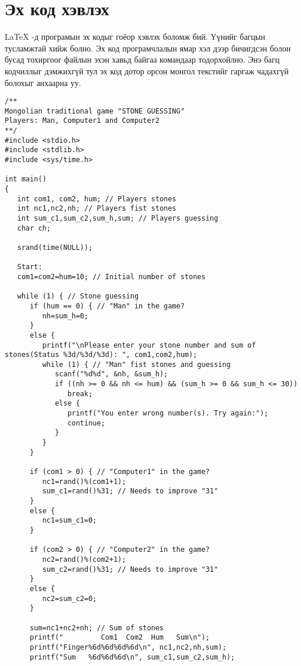 
\section{Эх код хэвлэх}

\LaTeX{} -д програмын эх кодыг гоёор хэвлэх боломж бий. Үүнийг  багцын тусламжтай хийж болно. Эх код програмчлалын ямар хэл дээр бичигдсэн болон бусад тохиргоог  файлын эхэн хавьд байгаа  командаар тодорхойлно. Энэ багц  кодчиллыг дэмжихгүй тул эх код дотор орсон монгол текстийг гаргаж чадахгүй болохыг анхаарна уу.
  
\begin{lstlisting}[label=some-code,caption=Уламжлалт монгол тоглоом \enquote{Чулуу таалцах}]
/**
Mongolian traditional game "STONE GUESSING"
Players: Man, Computer1 and Computer2
**/
#include <stdio.h>
#include <stdlib.h>
#include <sys/time.h>

int main()
{
   int com1, com2, hum; // Players stones
   int nc1,nc2,nh; // Players fist stones
   int sum_c1,sum_c2,sum_h,sum; // Players guessing
   char ch;

   srand(time(NULL));

   Start:
   com1=com2=hum=10; // Initial number of stones

   while (1) { // Stone guessing
      if (hum == 0) { // "Man" in the game?
         nh=sum_h=0;
      }
      else {
         printf("\nPlease enter your stone number and sum of stones(Status %3d/%3d/%3d): ", com1,com2,hum);
         while (1) { // "Man" fist stones and guessing 
            scanf("%d%d", &nh, &sum_h);
            if ((nh >= 0 && nh <= hum) && (sum_h >= 0 && sum_h <= 30))
               break;
            else {
               printf("You enter wrong number(s). Try again:");
               continue;
            }
         }
      }

      if (com1 > 0) { // "Computer1" in the game?
         nc1=rand()%(com1+1);
         sum_c1=rand()%31; // Needs to improve "31"
      }
      else {
         nc1=sum_c1=0;
      }

      if (com2 > 0) { // "Computer2" in the game?
         nc2=rand()%(com2+1);
         sum_c2=rand()%31; // Needs to improve "31"
      }
      else {
         nc2=sum_c2=0;
      }

      sum=nc1+nc2+nh; // Sum of stones
      printf("         Com1  Com2  Hum   Sum\n");
      printf("Finger%6d%6d%6d%6d\n", nc1,nc2,nh,sum);
      printf("Sum   %6d%6d%6d\n", sum_c1,sum_c2,sum_h);


\end{lstlisting}
